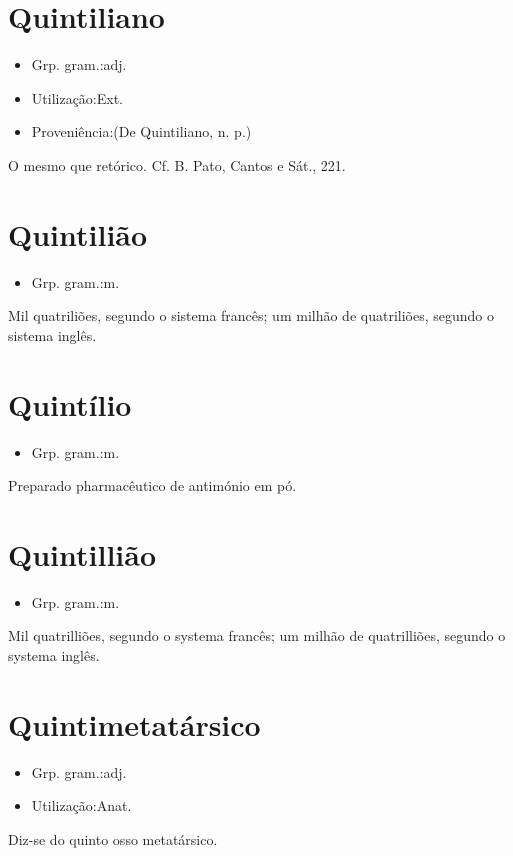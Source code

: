 \section{Quintiliano}
\begin{itemize}
\item {Grp. gram.:adj.}
\end{itemize}
\begin{itemize}
\item {Utilização:Ext.}
\end{itemize}
\begin{itemize}
\item {Proveniência:(De \textunderscore Quintiliano\textunderscore , n. p.)}
\end{itemize}
O mesmo que \textunderscore retórico\textunderscore . Cf. B. Pato, \textunderscore Cantos e Sát.\textunderscore , 221.
\section{Quintilião}
\begin{itemize}
\item {Grp. gram.:m.}
\end{itemize}
Mil quatriliões, segundo o sistema francês; um milhão de quatriliões, segundo o sistema inglês.
\section{Quintílio}
\begin{itemize}
\item {Grp. gram.:m.}
\end{itemize}
Preparado pharmacêutico de antimónio em pó.
\section{Quintillião}
\begin{itemize}
\item {Grp. gram.:m.}
\end{itemize}
Mil quatrilliões, segundo o systema francês; um milhão de quatrilliões, segundo o systema inglês.
\section{Quintimetatársico}
\begin{itemize}
\item {Grp. gram.:adj.}
\end{itemize}
\begin{itemize}
\item {Utilização:Anat.}
\end{itemize}
Diz-se do quinto osso metatársico.
